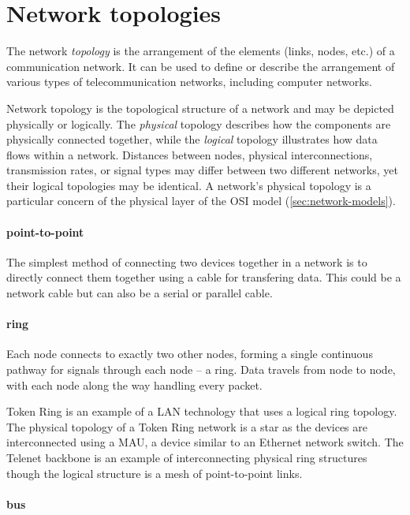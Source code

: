 \section{Network topologies}
\label{sec:network-topologies}

The network \emph{topology} is the arrangement of the elements (links, nodes, etc.) of a communication network.
It can be used to define or describe the arrangement of various types of telecommunication networks, including computer networks.

Network topology is the topological structure of a network and may be depicted physically or logically.
The \emph{physical} topology describes how the components are physically connected together, while the \emph{logical} topology illustrates how data flows within a network.
Distances between nodes, physical interconnections, transmission rates, or signal types may differ between two different networks, yet their logical topologies may be identical.
A network's physical topology is a particular concern of the physical layer of the \gls{OSI} model (\vref{sec:network-models}).



\paragraph{point-to-point}
The simplest method of connecting two devices together in a network is to directly connect them together using a cable for transfering data.
This could be a network cable but can also be a serial or parallel cable.


\paragraph{ring}
Each node connects to exactly two other nodes, forming a single continuous pathway for signals through each node -- a ring.
Data travels from node to node, with each node along the way handling every packet.

Token Ring is an example of a \gls{LAN} technology that uses a logical ring topology.
The physical topology of a Token Ring network is a star as the devices are interconnected using a \ac{MAU}, a device similar to an Ethernet network switch.
The Telenet backbone is an example of interconnecting physical ring structures though the logical structure is a mesh of point-to-point links.


\paragraph{bus}

